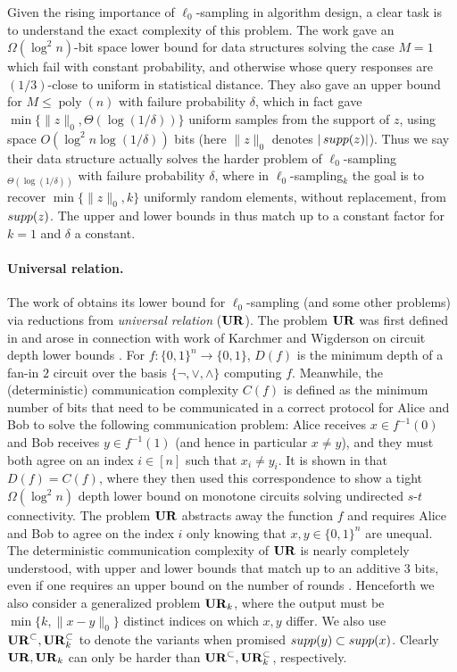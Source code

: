 Given the rising importance of $\ell_0$-sampling in algorithm design, a clear task is to understand the exact complexity of this problem. The work \cite{JowhariST11} gave an $\Omega(\log^2 n)$-bit space lower bound for data structures solving the case $M=1$ which fail with constant probability, and otherwise whose query responses are $(1/3)$-close to uniform in statistical distance. They also gave an upper bound for $M \le \mathop{poly}(n)$ with failure probability $\delta$, which in fact gave $\min\{\|z\|_0, \Theta(\log(1/\delta))\}$ uniform samples from the support of $z$, using space $O(\log^2 n \log(1/\delta))$ bits (here $\|z\|_0$ denotes $|\mathop{supp}(z)|$). Thus we say their data structure actually solves the harder problem of $\ell_0$-sampling$_{\Theta(\log(1/\delta))}$ with failure probability $\delta$, where in $\ell_0$-sampling$_k$ the goal is to recover $\min\{\|z\|_0, k\}$ uniformly random elements, without replacement, from $\mathop{supp}(z)$.  The upper and lower bounds in \cite{JowhariST11} thus match up to a constant factor for $k = 1$ and $\delta$ a constant.

\paragraph{Universal relation.} The work of \cite{JowhariST11} obtains its lower bound for $\ell_0$-sampling (and some other problems) via reductions from {\em universal relation} ($\mathbf{UR}$). The problem $\mathbf{UR}$ was first defined in \cite{KarchmerRW95} and arose in connection with work of Karchmer and Wigderson on circuit depth lower bounds \cite{KarchmerW90}. For $f:\{0,1\}^n\rightarrow\{0,1\}$, $D(f)$ is the minimum depth of a fan-in $2$ circuit over the basis $\{\neg, \vee, \wedge\}$ computing $f$. Meanwhile, the (deterministic) communication complexity $C(f)$ is defined as the minimum number of bits that need to be communicated in a correct protocol for Alice and Bob to solve the following communication problem: Alice receives $x\in f^{-1}(0)$ and Bob receives $y\in f^{-1}(1)$ (and hence in particular $x\neq y$), and they must both agree on an index $i\in[n]$ such that $x_i\neq y_i$. It is shown in \cite{KarchmerW90} that $D(f) = C(f)$, where they then used this correspondence to show a tight $\Omega(\log^2 n)$ depth lower bound on monotone circuits solving undirected $s$-$t$ connectivity. The problem $\mathbf{UR}$ abstracts away the function $f$ and requires Alice and Bob to agree on the index $i$ only knowing that $x,y\in\{0,1\}^n$ are unequal. The deterministic communication complexity of $\mathbf{UR}$ is nearly completely understood, with upper and lower bounds that match up to an additive $3$ bits, even if one requires an upper bound on the number of rounds \cite{TardosZ97}. Henceforth we also consider a generalized problem $\mathbf{UR}_k$, where the output must be $\min\{k, \|x-y\|_0\}$ distinct indices on which $x, y$ differ. We also use $\mathbf{UR}^{\subset}, \mathbf{UR}_k^{\subset}$ to denote the variants when promised $\mathop{supp}(y)\subset \mathop{supp}(x)$. Clearly $\mathbf{UR}, \mathbf{UR}_k$ can only be harder than $\mathbf{UR}^\subset, \mathbf{UR}_k^\subset$, respectively.

